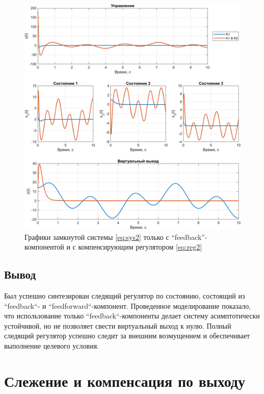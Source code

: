 \begin{figure}[H]
    \centering
    \includegraphics[width=\linewidth]{figs/task2_2.png}
    \caption{Графики замкнутой системы \eqref{eq:sys2} только с ``feedback''-компонентой
    и с компенсирующим регулятором \eqref{eq:reg2}}
    \label{fig:2.2}
\end{figure}

\subsection{Вывод}

Был успешно синтезирован следящий регулятор по состоянию, состоящий 
из ``feedback``- и ``feedforward``-компонент. Проведенное моделирование 
показало, что использование только ``feedback``-компоненты делает 
систему асимптотически устойчивой, но не позволяет свести виртуальный 
выход к нулю. Полный следящий регулятор успешно следит за внешним
возмущением и обеспечивает выполнение целевого условия.


\newpage
\section{Слежение и компенсация по выходу}
